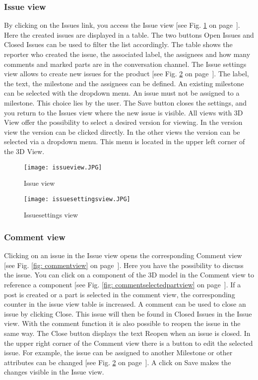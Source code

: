     \subsubsection*{Issue view}
    By clicking on the Issues link, you access the Issue view [see Fig. \ref{fig: issueview} on page~\pageref{fig: issueview}]. Here the created issues are displayed in a table. The two buttons Open Issues and Closed Issues can be used to filter the list accordingly. The table shows the reporter who created the issue, the associated label, the assignees and how many comments and marked parts are in the conversation channel. The Issue settings view allows to create new issues for the product [see Fig. \ref{fig: issuesettingsview} on page~\pageref{fig: issuesettingsview}]. The label, the text, the milestone and the assignees can be defined. An existing milestone can be selected with the dropdown menu. An issue must not be assigned to a milestone. This choice lies by the user. The Save button closes the settings, and you return to the Issues view where the new issue is visible. All views with 3D View offer the possibility to select a desired version for viewing. In the version view the version can be clicked directly. In the other views the version can be selected via a dropdown menu. This menu is located in the upper left corner of the 3D View.
    
    \begin{figure}[h]
        \centering
        \texttt{[image: issueview.JPG]}
        \caption{Issue view}
        \label{fig: issueview}
    \end{figure}

    \begin{figure}[h]
        \centering
        \texttt{[image: issuesettingsview.JPG]}
        \caption{Issuesettings view}
        \label{fig: issuesettingsview}
    \end{figure}

    \subsubsection*{Comment view}
    Clicking on an issue in the Issue view opens the corresponding Comment view [see Fig. \ref{fig: commentview} on page~\pageref{fig: commentview}]. Here you have the possibility to discuss the issue. You can click on a component of the 3D model in the Comment view to reference a component [see Fig. \ref{fig: commentselectedpartview} on page~\pageref{fig: commentselectedpartview}]. If a post is created or a part is selected in the comment view, the corresponding counter in the issue view table is increased. A comment can be used to close an issue by clicking Close. This issue will then be found in Closed Issues in the Issue view. With the comment function it is also possible to reopen the issue in the same way. The Close button displays the text Reopen when an issue is closed. In the upper right corner of the Comment view there is a button to edit the selected issue. For example, the issue can be assigned to another Milestone or other attributes can be changed [see Fig. \ref{fig: issuesettingsview} on page~\pageref{fig: issuesettingsview}]. A click on Save makes the changes visible in the Issue view.

